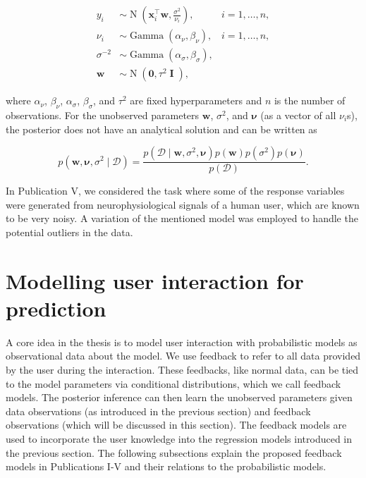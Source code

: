 \documentclass[dissertation,math,vertlayout,pdfa,colorlinks]{aaltoseries}
\newcommand{\bw}{\bm{w}}
\newcommand{\bD}{\mathcal{D}}
\DeclareMathOperator{\eye}{\textbf{I}}
\DeclareMathOperator{\normalpdf}{N}
\DeclareMathOperator{\gammapdf}{Gamma}
\newcommand{\tp}{^{\top}}
\begin{document}
	
\begin{align}\label{Eq:ard_Bayesian_regression}
y_i &\sim \normalpdf(\bm{x}_i\tp\bw,\frac{\sigma^2}{\nu_i}),  & i=1,\ldots,n,\\
\nu_i &\sim \gammapdf(\alpha_{\nu}, \beta_{\nu}), & i=1,\ldots,n,\nonumber \\
\sigma^{-2} &\sim \gammapdf(\alpha_{\sigma}, \beta_{\sigma}), \nonumber \\
\bw &\sim \normalpdf(\textbf{0},\tau^2 \eye), \nonumber
\end{align}

\noindent where $\alpha_{\nu}$, $\beta_{\nu}$, $\alpha_{\sigma}$, $\beta_{\sigma}$, and $\tau^2$ are fixed hyperparameters and $n$ is the number of observations. For the unobserved parameters $\bw$, $\sigma^2$, and $\bm{\nu}$ (as a vector of all $\nu_i$s), the posterior does not have an analytical solution and can be written as

\begin{equation}\label{Eq:Bayes_rule_ARD}
p(\bw, \bm{\nu}, \sigma^2 \mid \bD) = \frac{p(\bD \mid \bw, \sigma^2, \bm{\nu})p(\bw)p(\sigma^2)p(\bm{\nu})}{p(\bD)}.
\end{equation} 

\noindent In Publication V, we considered the task where some of the response variables were generated from neurophysiological  signals of a human user, which are known to be very noisy. A variation of the mentioned model was employed to handle the potential outliers in the data. 

\section{Modelling user interaction for prediction}\label{prob_model_user}

A core idea in the thesis is to model user interaction with probabilistic models as observational data about the model. We use feedback to refer to all data provided by the user during the interaction. 
These feedbacks, like normal data, can be tied to the model parameters via conditional distributions, which we call feedback models. The posterior inference can then learn the unobserved parameters given data observations (as introduced in the previous section) and feedback observations (which will be discussed in this section). The feedback models are used to incorporate the user knowledge into the regression models introduced in the previous section. The following subsections explain the proposed feedback models in Publications I-V and their relations to the probabilistic models.
\end{document}
